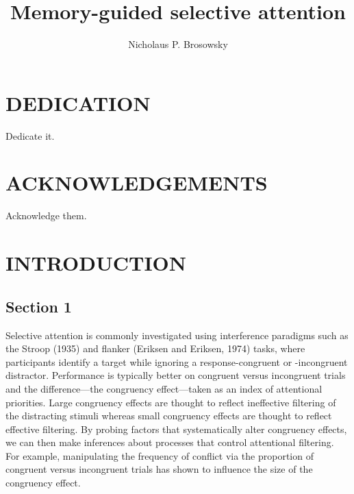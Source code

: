 \documentclass[]{DissertateCUNY}
\title{Memory-guided selective attention}
\author{Nicholaus P. Brosowsky}
\date{}
\begin{document}
\maketitle

\copyrightpage
\approvalpage
\abstractpage

\newpage
{}
\fancyhead[R]{\thepage}
\fancyfoot[C]{}
\chapter*{DEDICATION}

Dedicate it.

\newpage
{}
\fancyhead[R]{\thepage}
\fancyfoot[C]{}
\chapter*{ACKNOWLEDGEMENTS}

Acknowledge them.

\newpage
{}
\fancyhead[R]{\thepage}
\fancyfoot[C]{}
\tableofcontents

\newpage
{}
\fancyhead[R]{\thepage}
\fancyfoot[C]{}
\listoftables

\newpage
{}
\fancyhead[R]{\thepage}
\fancyfoot[C]{}
\listoffigures

\newpage
{}

\newpage
{}
\fancyhead[R]{\thepage}
\fancyfoot[C]{}

\chapter{INTRODUCTION}

\hypertarget{section-1}{%
\section{Section 1}\label{section-1}}

Selective attention is commonly investigated using interference
paradigms such as the Stroop (1935) and flanker (Eriksen and Eriksen,
1974) tasks, where participants identify a target while ignoring a
response-congruent or -incongruent distractor. Performance is typically
better on congruent versus incongruent trials and the difference---the
congruency effect---taken as an index of attentional priorities. Large
congruency effects are thought to reflect ineffective filtering of the
distracting stimuli whereas small congruency effects are thought to
reflect effective filtering. By probing factors that systematically
alter congruency effects, we can then make inferences about processes
that control attentional filtering. For example, manipulating the
frequency of conflict via the proportion of congruent versus incongruent
trials has shown to influence the size of the congruency effect.
\end{document}
